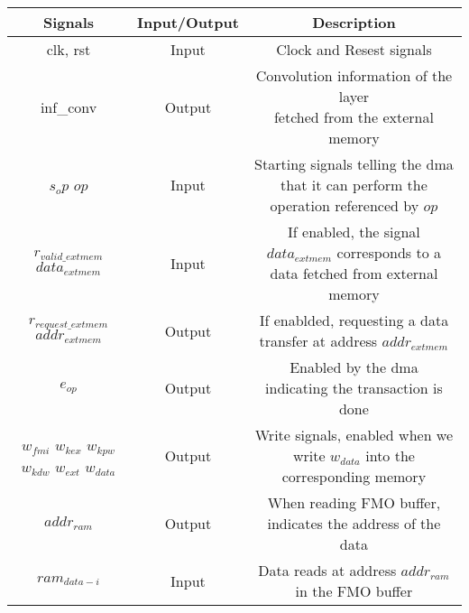 %
\begin{table}[H]
    \begin{tabular}{c|c|c}
        Signals & Input/Output & Description \\
        \hline \hline
        clk, rst & Input & Clock and Resest signals \\
        \hline
        inf\_conv & Output & \makecell{Convolution information of the layer \\ fetched from the external memory}\\
        \hline
        \makecell{$s_op$ \\ $op$} & Input & \makecell{Starting signals telling the \acrshort{dma} that it can perform \\ the operation referenced by $op$} \\
        \hline
        \makecell{$r_{valid\_extmem}$ \\ $data_{extmem}$} & Input & \makecell{If enabled, the signal $data_{extmem}$ corresponds \\ to a data fetched from external memory} \\
        \hline
        \makecell{$r_{request\_extmem}$ \\ $addr_{extmem}$} & Output & \makecell{If enablded, requesting a data transfer \\ at address $addr_{extmem}$}\\
        \hline
        $e_{op}$ & Output & \makecell{Enabled by the \acrshort{dma} \\ indicating the transaction is done}\\
        \hline
        \makecell{$w_{fmi}$ \\$w_{kex}$\\$w_{kpw}$\\$w_{kdw}$\\$w_{ext}$\\$w_{data}$} & Output & \makecell{Write signals, enabled when \\ we write $w_{data}$ into the corresponding memory}\\
        \hline
        $addr_{ram}$ & Output & \makecell{When reading FMO buffer, \\ indicates the address of the data}\\
        \hline
        $ram_{data-i}$ & Input & \makecell{Data reads at address $addr_{ram}$ \\ in the FMO buffer}\\

\end{tabular}
\end{table}
